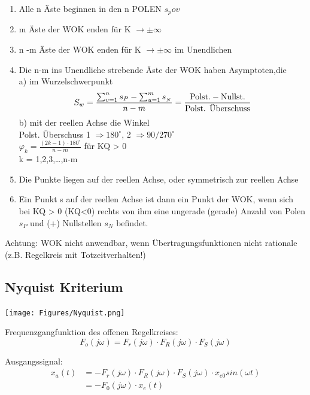 \begin{mdframed}[style=exercise]
	\begin{enumerate}[leftmargin=*]
		\item Alle n Äste beginnen in den n POLEN $s_pov$
		\item m Äste der WOK enden für K $\rightarrow \pm \infty$
		\item n -m Äste der WOK enden für K $\rightarrow \pm \infty$ im Unendlichen
		\item Die n-m ins Unendliche strebende Äste der WOK haben Asymptoten,die\\
		      a) im Wurzelschwerpunkt
		      \[S_{w}=\frac{\sum_{v=1}^{n} s_{P}-\sum_{u=1}^{m} s_{_{N}}}{n-m} 
                        = \dfrac{\textnormal{Polst.}- \textnormal{Nullst.}}{\textnormal{Polst. Überschuss}}\]
		      b) mit der reellen Achse die Winkel\\
			  Polst. Überschuss 1 $\Rightarrow 180^{\circ}$, 2 $\Rightarrow 90/270^{\circ}$\\
		      $\varphi_{k}=\frac{(2 k-1) \cdot 180^{\circ}}{n-m}$ für KQ > 0\\
		      k = 1,2,3,\dots,n-m
		\item Die Punkte liegen auf der reellen Achse, oder symmetrisch zur reellen Achse
		\item Ein Punkt s auf der reellen Achse ist dann ein Punkt der WOK, wenn sich bei KQ > 0 (KQ<0)
		      rechts von ihm eine ungerade (gerade) Anzahl von Polen $s_{P}$ und (+) Nullstellen $s_{N}$ befindet.
	\end{enumerate}

	Achtung: WOK nicht anwendbar, wenn Übertragungsfunktionen nicht rationale (z.B. Regelkreis mit Totzeitverhalten!)
\end{mdframed}

\subsection{Nyquist Kriterium}
\begin{center}
	\texttt{[image: Figures/Nyquist.png]}
\end{center}
Frequenzgangfunktion des offenen Regelkreises:
\[
	F_o (j\omega) = F_r (j\omega) \cdot F_R (j\omega) \cdot F_S (j\omega)
\]

Ausgangssignal:
\begin{align*}
	x_a(t) & =-F_r (j\omega) \cdot F_R (j\omega) \cdot F_S (j\omega) \cdot
	x_{e0}sin(\omega t)                                                    \\
	       & = -F_0 (j\omega) \cdot x_e (t)
\end{align*}

